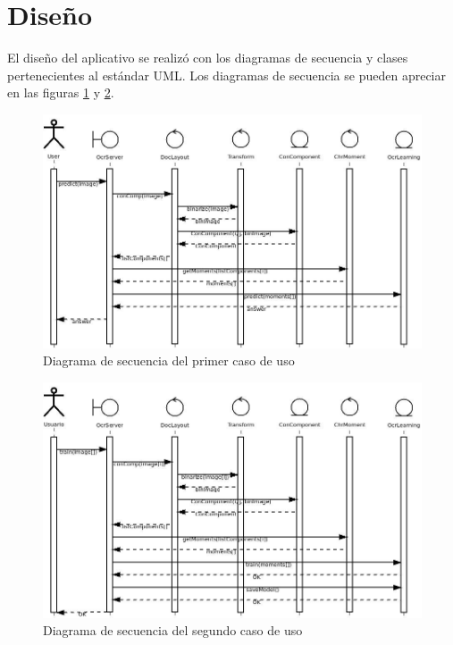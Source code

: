 \documentclass[a4paper, 11pt, oneside]{report}
\begin{document}
\section{Diseño}
El diseño del aplicativo se realizó con los diagramas de secuencia y clases pertenecientes al estándar UML. Los diagramas de secuencia se pueden apreciar en las figuras \ref{fig:sequence1} y \ref{fig:sequence2}.
\begin{figure}
\begin{center}
\includegraphics[width=20cm]{diagrams/sequence1.jpeg}
\end{center}
\caption{Diagrama de secuencia del primer caso de uso}
\label{fig:sequence1}
\end{figure}
\begin{figure}
\begin{center}
\includegraphics[width=20cm]{diagrams/sequence2.jpeg}
\end{center}
\caption{Diagrama de secuencia del segundo caso de uso}
\label{fig:sequence2}
\end{figure}
\end{document}
